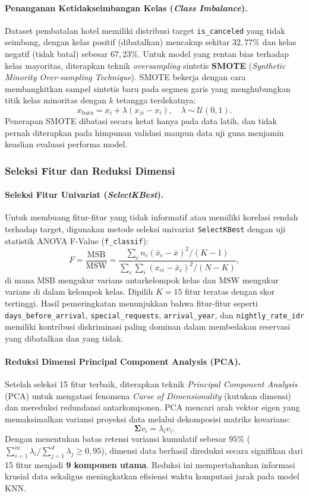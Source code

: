 \paragraph{Penanganan Ketidakseimbangan Kelas (\textit{Class Imbalance}).}
Dataset pembatalan hotel memiliki distribusi target \texttt{is\_canceled} yang tidak seimbang, dengan kelas
positif (dibatalkan) mencakup sekitar $32{,}77\%$ dan kelas negatif (tidak batal) sebesar $67{,}23\%$.
Untuk model yang rentan bias terhadap kelas mayoritas, diterapkan teknik \textit{oversampling} sintetis
\textbf{SMOTE} (\textit{Synthetic Minority Over-sampling Technique}). SMOTE bekerja dengan cara membangkitkan
sampel sintetis baru pada segmen garis yang menghubungkan titik kelas minoritas dengan $k$ tetangga terdekatnya:
\[
x_{\text{baru}} = x_i + \lambda (x_{zi} - x_i), \quad \lambda \sim \mathcal{U}(0, 1) .
\]
Penerapan SMOTE dibatasi secara ketat hanya pada data latih, dan tidak pernah diterapkan pada himpunan validasi
maupun data uji guna menjamin keaslian evaluasi performa model.

\subsubsection{Seleksi Fitur dan Reduksi Dimensi}

\paragraph{Seleksi Fitur Univariat (\textit{SelectKBest}).}
Untuk membuang fitur-fitur yang tidak informatif atau memiliki korelasi rendah terhadap target, digunakan
metode seleksi univariat \texttt{SelectKBest} dengan uji statistik ANOVA F-Value (\texttt{f\_classif}):
\[
F = \frac{\text{MSB}}{\text{MSW}} = \frac{\sum_{c} n_c (\bar{x}_c - \bar{x})^2 / (K - 1)}{\sum_{c} \sum_{i} (x_{ci} - \bar{x}_c)^2 / (N - K)} ,
\]
di mana $\text{MSB}$ mengukur varians antarkelompok kelas dan $\text{MSW}$ mengukur varians di dalam kelompok kelas.
Dipilih $K = 15$ fitur teratas dengan skor tertinggi. Hasil pemeringkatan menunjukkan bahwa fitur-fitur seperti
\texttt{days\_before\_arrival}, \texttt{special\_requests}, \texttt{arrival\_year}, dan \texttt{nightly\_rate\_idr}
memiliki kontribusi diskriminasi paling dominan dalam membedakan reservasi yang dibatalkan dan yang tidak.

\paragraph{Reduksi Dimensi Principal Component Analysis (PCA).}
Setelah seleksi 15 fitur terbaik, diterapkan teknik \textit{Principal Component Analysis} (PCA) untuk
mengatasi fenomena \textit{Curse of Dimensionality} (kutukan dimensi) dan mereduksi redundansi antarkomponen.
PCA mencari arah vektor eigen yang memaksimalkan variansi proyeksi data melalui dekomposisi matriks kovarians:
\[
\mathbf{\Sigma} v_i = \lambda_i v_i .
\]
Dengan menentukan batas retensi variansi kumulatif sebesar $95\%$ ($\sum_{i=1}^m \lambda_i / \sum_{j=1}^d \lambda_j \ge 0{,}95$),
dimensi data berhasil direduksi secara signifikan dari 15 fitur menjadi \textbf{9 komponen utama}.
Reduksi ini mempertahankan informasi krusial data sekaligus meningkatkan efisiensi waktu komputasi jarak pada model KNN.

